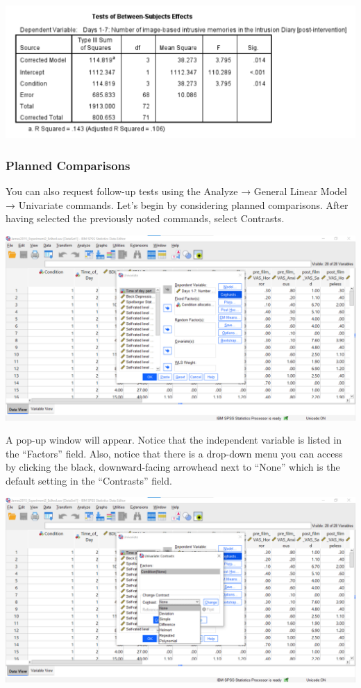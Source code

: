 \documentclass[
]{book}
\begin{document}
\includegraphics{img/8.6.6.40.png}

\hypertarget{planned-comparisons}{%
\subsubsection{Planned Comparisons}\label{planned-comparisons}}

You can also request follow-up tests using the {Analyze} → {General Linear Model} → {Univariate} commands. Let's begin by considering planned comparisons. After having selected the previously noted commands, select {Contrasts}.

\includegraphics{img/8.6.6.41.png}

A pop-up window will appear. Notice that the independent variable is listed in the ``Factors'' field. Also, notice that there is a drop-down menu you can access by clicking the black, downward-facing arrowhead next to ``None'' which is the default setting in the ``Contrasts'' field.

\includegraphics{img/8.6.6.42.png}
\end{document}
